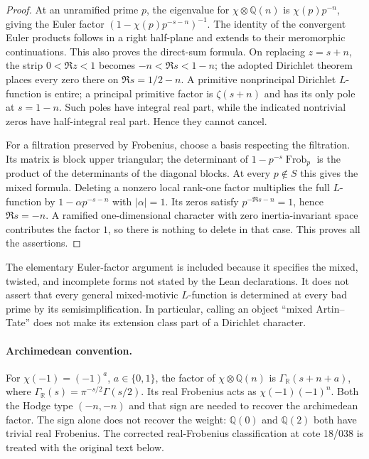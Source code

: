 \documentclass[11pt,a4paper]{article}
\theoremstyle{definition}\newtheorem{definition}[theorem]{Definition}
\theoremstyle{remark}\newtheorem{remark}[theorem]{Remark}
\begin{document}
\begin{proof}
At an unramified prime $p$, the eigenvalue for $\chi\otimes\mathbb Q(n)$
is $\chi(p)p^{-n}$, giving the Euler factor
$(1-\chi(p)p^{-s-n})^{-1}$.  The identity of the convergent Euler
products follows in a right half-plane and extends to their meromorphic
continuations.  This also proves the direct-sum formula.  On replacing
$z=s+n$, the strip $0<\Re z<1$ becomes
$-n<\Re s<1-n$; the adopted Dirichlet theorem places every zero there
on $\Re s=1/2-n$.  A primitive nonprincipal Dirichlet $L$-function is
entire; a principal primitive factor is $\zeta(s+n)$ and has its only
pole at $s=1-n$.  Such poles have integral real part, while the indicated
nontrivial zeros have half-integral real part.  Hence they cannot cancel.

For a filtration preserved by Frobenius, choose a basis respecting the
filtration.  Its matrix is block upper triangular; the determinant of
$1-p^{-s}\operatorname{Frob}_p$ is the product of the determinants of
the diagonal blocks.  At every $p\notin S$ this gives the mixed formula.
Deleting a nonzero local rank-one factor multiplies the full $L$-function
by $1-\alpha p^{-s-n}$ with $|\alpha|=1$.  Its zeros satisfy
$p^{-\Re s-n}=1$, hence $\Re s=-n$.  A ramified one-dimensional
character with zero inertia-invariant space contributes the factor $1$,
so there is nothing to delete in that case.  This proves all the assertions.
\end{proof}

The elementary Euler-factor argument is included because it specifies the
mixed, twisted, and incomplete forms not stated by the Lean declarations.
It does not assert that every general mixed-motivic $L$-function is
determined at every bad prime by its semisimplification.  In particular,
calling an object ``mixed Artin--Tate'' does not make its extension class
part of a Dirichlet character.

\paragraph{Archimedean convention.}
For $\chi(-1)=(-1)^a$, $a\in\{0,1\}$, the factor of
$\chi\otimes\mathbb Q(n)$ is $\Gamma_{\mathbb R}(s+n+a)$, where
$\Gamma_{\mathbb R}(s)=\pi^{-s/2}\Gamma(s/2)$.  Its real Frobenius
acts as $\chi(-1)(-1)^n$.  Both the Hodge type $(-n,-n)$ and that
sign are needed to recover the archimedean factor.  The sign alone does
not recover the weight: $\mathbb Q(0)$ and $\mathbb Q(2)$ both have
trivial real Frobenius.  The corrected real-Frobenius classification at
cote 18/038 is treated with the original text below.
\end{document}
